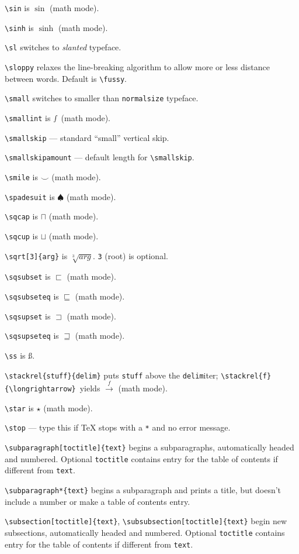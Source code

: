\verb"\sin" is $\sin$ (math mode).

\verb"\sinh" is $\sinh$ (math mode).

\verb"\sl" switches to {\sl slanted\/} typeface.

\verb"\sloppy" relaxes the line-breaking algorithm to allow more or less
	distance between words.  Default is \verb"\fussy".

\verb"\small" switches to smaller than \verb"normalsize" typeface.

\verb"\smallint" is $\smallint$ (math mode).

\verb"\smallskip" --- standard ``small'' vertical skip.

\verb"\smallskipamount" --- default length for \verb"\smallskip".

\verb"\smile" is $\smile$ (math mode).

\verb"\spadesuit" is $\spadesuit$ (math mode).

\verb"\sqcap" is $\sqcap$ (math mode).

\verb"\sqcup" is $\sqcup$ (math mode).

\verb"\sqrt[3]{arg}" is $\sqrt[3]{arg}$.  \verb"3" (root) is optional.

\verb"\sqsubset" is $\sqsubset$ (math mode).

\verb"\sqsubseteq" is $\sqsubseteq$ (math mode).

\verb"\sqsupset" is $\sqsupset$ (math mode).

\verb"\sqsupseteq" is $\sqsupseteq$ (math mode).

\verb"\ss" is \ss.

\verb"\stackrel{stuff}{delim}" puts \verb"stuff" above the \verb"delim"iter;
	\verb"\stackrel{f}{\longrightarrow}"\ yields
	$\stackrel{f}{\longrightarrow}$ (math mode).

\verb"\star" is $\star$ (math mode).

\verb"\stop" --- type this if \TeX{} stops with a \verb"*" and no error
	message.

\verb"\subparagraph[toctitle]{text}" begins a subparagraphs, automatically headed and
	numbered.  Optional \verb"toctitle" contains entry for the
	table of contents if different from \verb"text".

\verb"\subparagraph*{text}" begins a subparagraph and prints a title, but doesn't include
	a number or make a table of contents entry.

\verb"\subsection[toctitle]{text}", \verb"\subsubsection[toctitle]{text}" begin new
	subsections, automatically headed and numbered.  Optional
	\verb"toctitle" contains entry for the table of contents if
	different from \verb"text".

